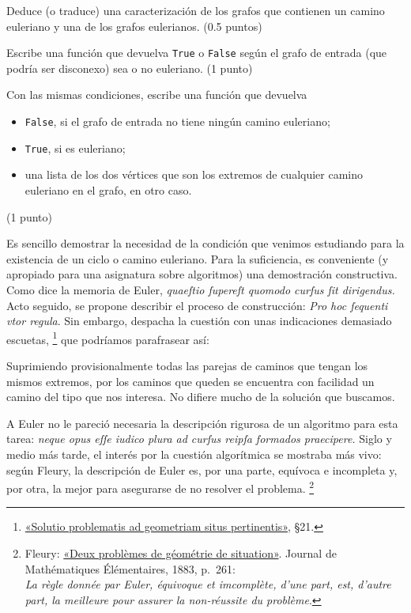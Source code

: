 \prop
{Deduce (o traduce) una caracterización de los grafos que
  contienen un camino euleriano y una de los grafos
  eulerianos. (0.5 puntos)}

\prop
{Escribe una función que devuelva \texttt{True}
  o \texttt{False} según el grafo de entrada (que podría ser
  disconexo) sea o no euleriano. (1 punto)}

\prop
{Con las mismas condiciones, escribe una función que devuelva
\begin{itemize}
\item \texttt{False}, si el grafo de entrada no tiene ningún camino euleriano;
\item \texttt{True}, si es euleriano;
\item una lista de los dos vértices que son los extremos de cualquier camino euleriano en el grafo, en otro caso.
\end{itemize} (1 punto)}



Es sencillo demostrar la necesidad de la condición que
venimos estudiando para la existencia de un ciclo o camino
euleriano. Para la suficiencia, es conveniente (y apropiado
para una asignatura sobre algoritmos) una demostración
constructiva. Como dice la memoria de Euler, \emph{quaeſtio
ſupereſt quomodo curſus ſit dirigendus.} Acto seguido, se
propone describir el proceso de construcción: \emph{Pro hoc
ſequenti vtor regula}. Sin embargo, despacha la cuestión con
unas indicaciones demasiado escuetas,%
\footnote{%
\href{http://eulerarchive.maa.org/pages/E053.html}
{«Solutio problematis ad geometriam situs pertinentis»}, §21.}
que podríamos parafrasear así:
\vspace{-4mm}


\aparte%
{Suprimiendo provisionalmente todas las parejas de caminos
que tengan los mismos extremos, por los caminos que queden
se encuentra con facilidad un camino del tipo que nos
interesa. No difiere mucho de la solución que buscamos.}

A Euler no le pareció necesaria la descripción rigurosa de
un algoritmo para esta tarea: \emph{neque opus eſſe iudico
plura ad curſus reipſa formados praecipere.}
Siglo y medio
más tarde, el interés por la cuestión algorítmica se
mostraba más vivo: según Fleury, la descripción de Euler es,
por una parte, equívoca e incompleta y, por otra, la mejor
para asegurarse de no resolver el problema.%
\footnote{{\sc Fleury}:
\href{https://archive.org/details/s2journaldemathm02pari/page/n265}
{«Deux problèmes de géométrie de situation»}.
Journal de Mathématiques Élémentaires, 1883, p. 261:\\
\emph{%
La règle donnée par Euler, équivoque et imcomplète, d’une
part, est, d’autre part, la meilleure pour assurer la
non-réussite du problème}.}

